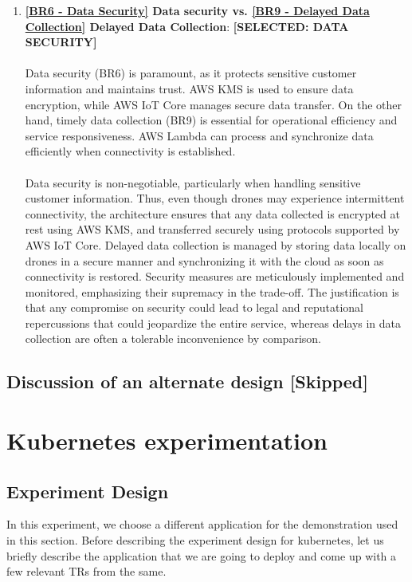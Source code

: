 \documentclass{article}
\begin{document}
\begin{enumerate}
    \item \textbf{\ref{BR6 - Data Security} Data security vs. \ref{BR9 - Delayed Data Collection} Delayed Data Collection}: \textbf{[SELECTED: DATA SECURITY]}\\\\
    Data security (BR6) is paramount, as it protects sensitive customer information and maintains trust. AWS KMS is used to ensure data encryption, while AWS IoT Core manages secure data transfer. On the other hand, timely data collection (BR9) is essential for operational efficiency and service responsiveness. AWS Lambda can process and synchronize data efficiently when connectivity is established.\\\\
    Data security is non-negotiable, particularly when handling sensitive customer information. Thus, even though drones may experience intermittent connectivity, the architecture ensures that any data collected is encrypted at rest using AWS KMS, and transferred securely using protocols supported by AWS IoT Core. Delayed data collection is managed by storing data locally on drones in a secure manner and synchronizing it with the cloud as soon as connectivity is restored. Security measures are meticulously implemented and monitored, emphasizing their supremacy in the trade-off. The justification is that any compromise on security could lead to legal and reputational repercussions that could jeopardize the entire service, whereas delays in data collection are often a tolerable inconvenience by comparison.


\end{enumerate}

\subsection{Discussion of an alternate design \color{red}[Skipped]}

\newpage
\section{Kubernetes experimentation}
\subsection{Experiment Design}
In this experiment, we choose a different application for the demonstration used in this section. Before describing the experiment design for kubernetes, let us briefly describe the application that we are going to deploy and come up with a few relevant TRs from the same. 
\end{document}
